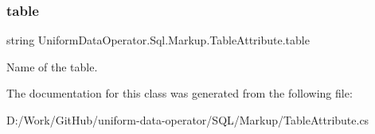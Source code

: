 \subsubsection{\texorpdfstring{table}{table}}
{\footnotesize\ttfamily string Uniform\+Data\+Operator.\+Sql.\+Markup.\+Table\+Attribute.\+table}



Name of the table. 



The documentation for this class was generated from the following file\+:\begin{DoxyCompactItemize}
\item 
D\+:/\+Work/\+Git\+Hub/uniform-\/data-\/operator/\+S\+Q\+L/\+Markup/Table\+Attribute.\+cs\end{DoxyCompactItemize}
